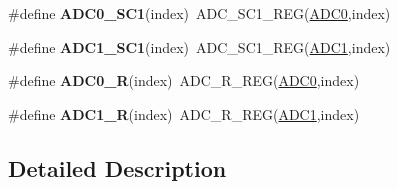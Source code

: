 \begin{DoxyCompactItemize}
\item 
\#define {\bfseries A\+D\+C0\+\_\+\+S\+C1}(index)~A\+D\+C\+\_\+\+S\+C1\+\_\+\+R\+EG(\hyperlink{group__ADC__Peripheral__Access__Layer_ga0d2ea0f4a8dd17bf08e69d05deacbcb5}{A\+D\+C0},index)\hypertarget{group__ADC__Register__Accessor__Macros_ga74e1388b9008043dfffab26709577f14}{}\label{group__ADC__Register__Accessor__Macros_ga74e1388b9008043dfffab26709577f14}

\item 
\#define {\bfseries A\+D\+C1\+\_\+\+S\+C1}(index)~A\+D\+C\+\_\+\+S\+C1\+\_\+\+R\+EG(\hyperlink{group__ADC__Peripheral__Access__Layer_ga90d2d5c526ce5c0a551f533eccbee71a}{A\+D\+C1},index)\hypertarget{group__ADC__Register__Accessor__Macros_ga29f47c5b5e62b79d0828968e9947d1d8}{}\label{group__ADC__Register__Accessor__Macros_ga29f47c5b5e62b79d0828968e9947d1d8}

\item 
\#define {\bfseries A\+D\+C0\+\_\+R}(index)~A\+D\+C\+\_\+\+R\+\_\+\+R\+EG(\hyperlink{group__ADC__Peripheral__Access__Layer_ga0d2ea0f4a8dd17bf08e69d05deacbcb5}{A\+D\+C0},index)\hypertarget{group__ADC__Register__Accessor__Macros_ga6e68bb0b85f28213a274b53aa8ddfc36}{}\label{group__ADC__Register__Accessor__Macros_ga6e68bb0b85f28213a274b53aa8ddfc36}

\item 
\#define {\bfseries A\+D\+C1\+\_\+R}(index)~A\+D\+C\+\_\+\+R\+\_\+\+R\+EG(\hyperlink{group__ADC__Peripheral__Access__Layer_ga90d2d5c526ce5c0a551f533eccbee71a}{A\+D\+C1},index)\hypertarget{group__ADC__Register__Accessor__Macros_gaad3bd1167a184f5fe2d09039321c4f2e}{}\label{group__ADC__Register__Accessor__Macros_gaad3bd1167a184f5fe2d09039321c4f2e}

\end{DoxyCompactItemize}


\subsection{Detailed Description}
